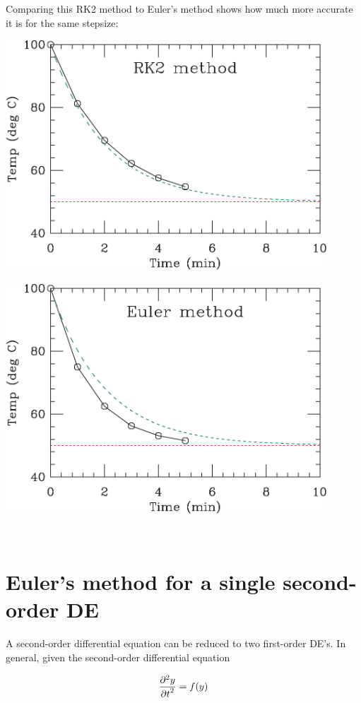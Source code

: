 \documentclass[12ampt]{article}
\def\PARTWO#1#2{ {{\partial^2 #1}\over{\partial #2}^2} }
\begin{document}
Comparing this RK2 method to Euler's method shows how much more accurate it is
for the same stepsize:

\begin{minipage}{0.5\textwidth}
\includegraphics[width=0.9\textwidth]{rk5-crop.pdf}
\end{minipage}
\begin{minipage}{0.5\textwidth}
\includegraphics[width=0.9\textwidth]{euler5-crop.pdf}
\end{minipage}
\
\section{Euler's method for a single second-order DE}

A second-order differential equation can be reduced to two first-order DE's. In general, given the second-order differential equation

\begin{equation}
  \PARTWO{y}{t}=f(y)
\end{equation}
\end{document}
